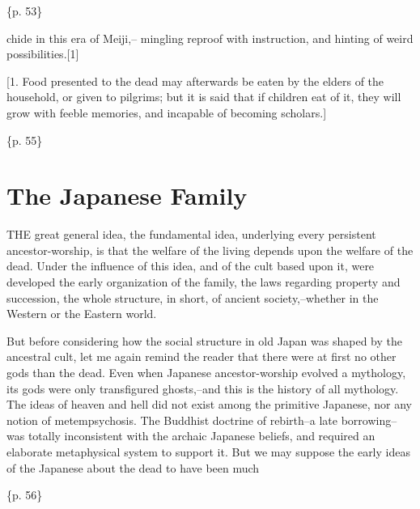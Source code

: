 \{p. 53\}

chide in this era of Meiji,-- mingling reproof with instruction, and hinting of weird possibilities.[1]

[1. Food presented to the dead may afterwards be eaten by the elders of the household, or given to pilgrims; but it is said that if children eat of it, they will grow with feeble memories, and incapable of becoming scholars.]

\{p. 55\}

\section{The Japanese Family}
\label{sec:org279b981}

THE great general idea, the fundamental idea, underlying every persistent ancestor-worship, is that the welfare of the living depends upon the welfare of the dead. Under the influence of this idea, and of the cult based upon it, were developed the early organization of the family, the laws regarding property and succession, the whole structure, in short, of ancient society,--whether in the Western or the Eastern world.

But before considering how the social structure in old Japan was shaped by the ancestral cult, let me again remind the reader that there were at first no other gods than the dead. Even when Japanese ancestor-worship evolved a mythology, its gods were only transfigured ghosts,--and this is the history of all mythology. The ideas of heaven and hell did not exist among the primitive Japanese, nor any notion of metempsychosis. The Buddhist doctrine of rebirth--a late borrowing--was totally inconsistent with the archaic Japanese beliefs, and required an elaborate metaphysical system to support it. But we may suppose the early ideas of the Japanese about the dead to have been much

\{p. 56\}

